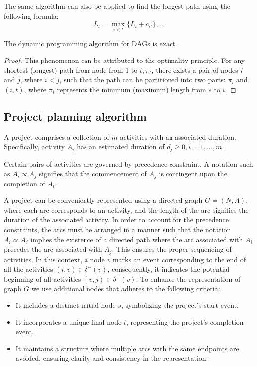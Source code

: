 The same algorithm can also be applied to find the longest path using the following formula:
\[L_t=\max_{i<t}\{L_i+c_{it}\},\dots\]

\begin{proposition}
    The dynamic programming algorithm for DAGs is exact. 
\end{proposition}
\begin{proof}
    This phenomenon can be attributed to the optimality principle.
    For any shortest (longest) path from node from 1 to $t,\pi_t$, there exists a pair of nodes $i$ and $j$, where $i < j$,  such that the path can be partitioned into two parts: $\pi_i$ and $(i,t)$, where $\pi_i$ represents the minimum (maximum) length from $s$ to $i$.
\end{proof}

\subsection{Project planning algorithm}
\begin{definition}
    A project  comprises a collection of $m$ activities with an associated duration. 
    Specifically, activity $A_i$ has an estimated duration of $d_j \geq 0, i=1,\dots,m$. 
\end{definition}
\begin{definition}
    Certain pairs of activities are governed by precedence constraint. 
    A notation such as $A_i \varpropto A_j$ signifies that the commencement of $A_j$ is contingent upon the completion of $A_i$. 
\end{definition}
A project can be conveniently represented using a directed graph $G = (N, A)$, where each arc corresponds to an activity, and the length of the arc signifies the duration of the associated activity.
In order to account for the precedence constraints, the arcs must be arranged in a manner such that the notation $A_i \varpropto A_j$ implies the existence of a directed path where the arc associated with $A_i$ precedes the arc associated with $A_j$.
This ensures the proper sequencing of activities.
In this context, a node $v$ marks an event corresponding to the end of all the activities $(i,v) \in \delta^{-}(v)$, consequently, it indicates the potential beginning of all activities $(v,j) \in \delta^{+}(v)$. 
To enhance the representation of graph $G$ we use additional nodes that adheres to the following criteria:
\begin{itemize}
    \item It includes a distinct initial node $s$, symbolizing the project's start event.
    \item It incorporates a unique final node $t$, representing the project's completion event.
    \item It maintains a structure where multiple arcs with the same endpoints are avoided, ensuring clarity and consistency in the representation. 
\end{itemize}
